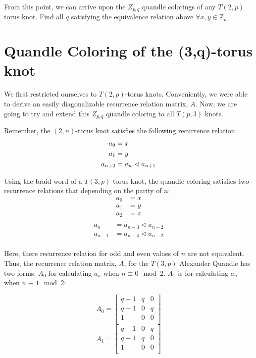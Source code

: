 \documentclass[paper.tex]{subfiles}
\begin{document}
From this point, we can arrive upon the $Z_{p,q}$ quandle colorings of any $T(2, p)$ torus knot. Find all $q$ satisfying the equivalence relation above $\forall x,y \in \mathbb{Z}_n$

\section{Quandle Coloring of the (3,q)-torus knot}\label{sec:3ntorus}
We first restricted ourselves to $T(2,p)$-torus knots. Conveniently, we were able to derive an easily diagonalizable recurrence relation matrix, $A$. Now, we are going to try and extend this $Z_{p,q}$ quandle coloring to all $T(p,3)$ knots.

Remember, the $(2,n)$-torus knot satisfies the following recurrence relation:
\begin{align*}
	a_0 &= x \\
	a_1 &= y \\
	a_{n+2} &= a_{n} \vartriangleleft a_{n+1} \\
\end{align*}

Using the braid word of a $T(3,p)$-torus knot, the quandle coloring satisfies two recurrence relations that depending on the parity of $n$:
\begin{align*}
	a_0 &= x \\
	a_1 &= y \\
	a_2 &= z \\
\end{align*}
\begin{align*}
	a_{n} &= a_{n-3} \triangleleft a_{n-2} \\
	a_{n-1} &= a_{n-4} \triangleleft a_{n-2} \\
\end{align*}

Here, there recurrence relation for odd and even values of $n$ are not equivalent. Thus, the recurrence relation matrix, $A$, for the $T(3, p)$ Alexander Quandle has two forms. $A_{0}$ for calculating $a_{n}$ when $n \equiv 0 \mod 2$. $A_{1}$ is for calculating $a_{n}$ when $n \equiv 1 \mod 2$:

\[ A_{0} =
\left[ \begin{array}{ccc}
q-1 & q & 0 \\
q-1 & 0 & q \\
1 & 0 & 0 \\
\end{array} \right]
\]
\[ A_{1} =
\left[ \begin{array}{ccc}
q-1 & 0 & q \\
q-1 & q & 0 \\
1 & 0 & 0 \\
\end{array} \right]
\]
\end{document}
